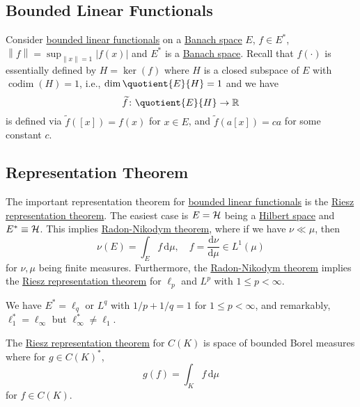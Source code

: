 \subsection{Bounded Linear Functionals}
Consider \hyperref[def:bounded-linear-functional]{bounded linear functionals} on a \hyperref[def:Banach-space]{Banach space} \(E\), \(f\in E^{\ast} \), \(\left\lVert f\right\rVert = \sup _{\left\lVert x\right\rVert = 1}\left\vert f(x) \right\vert \) and \(E^{\ast} \) is a \hyperref[def:Banach-space]{Banach space}. Recall that \(f(\cdot)\) is essentially defined by \(H = \ker(f)\) where \(H\) is a closed subspace of \(E\) with \(\mathop{\mathrm{codim}}(H) = 1\), i.e., \(\dim \quotient{E}{H} = 1 \) and we have
\[
	\widetilde{f} \colon \quotient{E}{H} \to \mathbb{\MakeUppercase{r}}
\]
is defined via \(\widetilde{f} ([x]) = f(x)\) for \(x\in E\), and \(\widetilde{f} (a[x]) = ca\)  for some constant \(c\).

\subsection{Representation Theorem}
The important representation theorem for \hyperref[def:bounded-linear-functional]{bounded linear functionals} is the \hyperref[thm:Riesz-representation]{Riesz representation theorem}. The easiest case is \(E = \mathcal{\MakeUppercase{h}} \) being a \hyperref[def:Hilbert-space]{Hilbert space} and \(E^{\ast} \equiv \mathcal{\MakeUppercase{h}} \). This implies \hyperref[thm:Radon-Nikodym]{Radon-Nikodym theorem}, where if we have \(\nu \ll \mu \), then
\[
	\nu (E) = \int _E f\,\mathrm{d} \mu ,\quad f = \frac{\mathrm{d}\nu }{\mathrm{d}\mu } \in L^1(\mu )
\]
for \(\nu , \mu \) being finite measures. Furthermore, the \hyperref[thm:Radon-Nikodym]{Radon-Nikodym theorem} implies the \hyperref[thm:Riesz-representation]{Riesz representation theorem} for \(\ell _p\) and \(L^p\) with \(1 \leq p < \infty \).

\begin{remark}
	We have \(E^{\ast} = \ell _q\) or \(L^q\) with \(1 / p + 1 / q = 1\) for \(1 \leq p < \infty \), and remarkably, \(\ell _1^{\ast} = \ell _\infty \) but \(\ell _\infty ^{\ast} \neq \ell _1\).
\end{remark}

\begin{remark}
	The \hyperref[thm:Riesz-representation]{Riesz representation theorem} for \(C(K)\) is space of bounded Borel measures where for \(g\in C(K)^{\ast} \),
	\[
		g(f) = \int _K f\,\mathrm{d} \mu
	\]
	for \(f\in C(K)\).
\end{remark}

